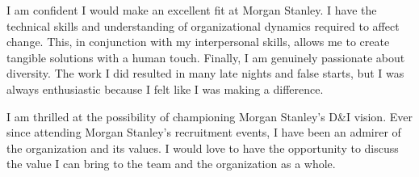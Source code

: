 \documentclass[11pt,a4paper,sans]{moderncv}        %
\newcommand{\CompanyName}{Morgan Stanley}
\begin{document}
I am confident I would make an excellent fit at \CompanyName. I have the technical
skills and understanding of organizational dynamics required to affect change.
This, in conjunction with my interpersonal skills, allows me to create tangible
solutions with a human touch. Finally, I am genuinely passionate about
diversity. The work I did resulted in many late nights and false starts, but I
was always enthusiastic because I felt like I was making a difference. 

I am thrilled at the possibility of championing \CompanyName's D\&I vision. Ever
since attending \CompanyName's recruitment events, I have been an admirer of the organization and
its values. I would love to have the opportunity to discuss the value I can
bring to the team and the organization as a whole.

\makeletterclosing

\end{document}
